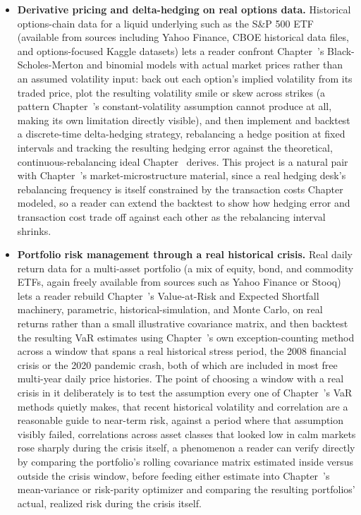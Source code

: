 \documentclass[../ai_in_finance]{subfiles}
\begin{document}
\begin{itemize}
    \item \textbf{Derivative pricing and delta-hedging on real options data.} Historical options-chain data for a liquid underlying such as the S\&P 500 ETF (available from sources including Yahoo Finance, CBOE historical data files, and options-focused Kaggle datasets) lets a reader confront Chapter~'s Black-Scholes-Merton and binomial models with actual market prices rather than an assumed volatility input: back out each option's implied volatility from its traded price, plot the resulting volatility smile or skew across strikes (a pattern Chapter~'s constant-volatility assumption cannot produce at all, making its own limitation directly visible), and then implement and backtest a discrete-time delta-hedging strategy, rebalancing a hedge position at fixed intervals and tracking the resulting hedging error against the theoretical, continuous-rebalancing ideal Chapter~ derives. This project is a natural pair with Chapter~'s market-microstructure material, since a real hedging desk's rebalancing frequency is itself constrained by the transaction costs Chapter~ modeled, so a reader can extend the backtest to show how hedging error and transaction cost trade off against each other as the rebalancing interval shrinks.
    \item \textbf{Portfolio risk management through a real historical crisis.} Real daily return data for a multi-asset portfolio (a mix of equity, bond, and commodity ETFs, again freely available from sources such as Yahoo Finance or Stooq) lets a reader rebuild Chapter~'s Value-at-Risk and Expected Shortfall machinery, parametric, historical-simulation, and Monte Carlo, on real returns rather than a small illustrative covariance matrix, and then backtest the resulting VaR estimates using Chapter~'s own exception-counting method across a window that spans a real historical stress period, the 2008 financial crisis or the 2020 pandemic crash, both of which are included in most free multi-year daily price histories. The point of choosing a window with a real crisis in it deliberately is to test the assumption every one of Chapter~'s VaR methods quietly makes, that recent historical volatility and correlation are a reasonable guide to near-term risk, against a period where that assumption visibly failed, correlations across asset classes that looked low in calm markets rose sharply during the crisis itself, a phenomenon a reader can verify directly by comparing the portfolio's rolling covariance matrix estimated inside versus outside the crisis window, before feeding either estimate into Chapter~'s mean-variance or risk-parity optimizer and comparing the resulting portfolios' actual, realized risk during the crisis itself.

\end{itemize}
\end{document}
